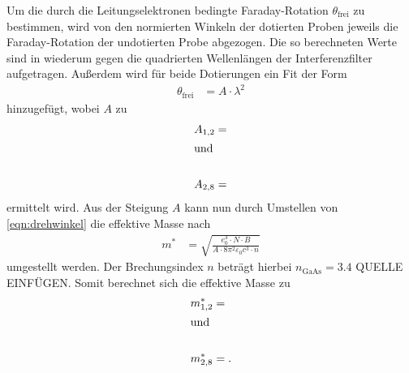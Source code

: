 Um die durch die Leitungselektronen bedingte Faraday-Rotation $\theta_{\text{frei}}$ zu bestimmen, wird von den normierten Winkeln der dotierten Proben jeweils
die Faraday-Rotation der undotierten Probe abgezogen.
Die so berechneten Werte sind in
wiederum gegen die quadrierten Wellenlängen der Interferenzfilter aufgetragen. Außerdem wird für beide Dotierungen ein Fit der Form
\begin{align*}
  \theta_{\text{frei}} &= A \cdot \lambda^2
\end{align*}
hinzugefügt, wobei $A$ zu
\begin{align*}
  A_{1,2}&= \\
  \shortintertext{und}\\
  A_{2,8}&= 
\end{align*}
ermittelt wird.
Aus der Steigung $A$ kann nun durch Umstellen von \autoref{eqn:drehwinkel} die effektive Masse nach
\begin{align*}
  m^* &= \sqrt{\frac{e_0^3\cdot N \cdot B}{A\cdot 8\pi^2\varepsilon_0 c^3 \cdot n }} 
\end{align*}
umgestellt werden.
Der Brechungsindex $n$ beträgt hierbei $n_{\text{GaAs}}=\num{3.4}$ QUELLE EINFÜGEN.
Somit berechnet sich die effektive Masse zu
\begin{align*}
  m^*_{1,2}&=\\
  \shortintertext{und}\\
  m^*_{2,8}&=.
\end{align*}